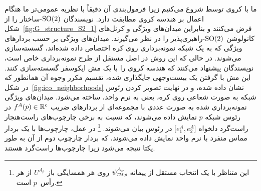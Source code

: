 ما با  کروی توسط \citet{kicanaoglu2019gaugeSphere} شروع می‌کنیم زیرا فرمول‌بندی آن دقیقاً با نظریه عمومی‌تر ما هنگام اعمال بر هندسه کروی مطابقت دارد.
نویسندگان $\operatorname{SO}(2)$-ساختار را از شکل~\ref{fig:G_structure_S2_1} فرض می‌کنند و بنابراین میدان‌های ویژگی و کرنل‌های کانولوشن $\operatorname{SO}(2)$-راهبری‌پذیر را در نظر می‌گیرند.
میدان‌های ویژگی بر حسب بردارهای ویژگی که به یک شبکه نمونه‌برداری روی کره اختصاص داده شده‌اند، گسسته‌سازی می‌شوند.
در حالی که این روش در اصل مستقل از طرح نمونه‌برداری خاص است، نویسندگان پیشنهاد می‌کنند که هندسه کروی را با یک مش ایکوسفر گسسته‌سازی کنند.
این مش با گرفتن یک بیست‌وجهی جایگذاری شده، تقسیم مکرر وجوه آن همانطور که در شکل~\ref{fig:ico_neighborhoods} نشان داده شده، و در نهایت تصویر کردن رئوس شبکه به صورت شعاعی روی کره، یعنی به نرم واحد، ساخته می‌شود.
میدان‌های ویژگی نمونه‌برداری شده به صورت عددی با مجموعه‌ای از بردارهای ضریب $f^A(p) \in \mathbb{R}^c$ در رئوس شبکه $p$ نمایش داده می‌شوند، که نسبت به برخی چارچوب‌های راست‌هنجار راست‌گرد دلخواه $\big[e_1^A, e_2^A \big]$ در رئوس بیان می‌شوند.%
\footnote{
	این متناظر با یک انتخاب مستقل از پیمانه $\psiTMp^{A_p}$ روی هر همسایگی باز $U^{A_p}$ از هر رأس~$p$ است.
}
در عمل، چارچوب‌ها با یک بردار مماس منفرد با نرم واحد نمایش داده می‌شوند، که بردار چارچوب دوم از آن به طور یکتا نتیجه می‌شود زیرا چارچوب‌ها راست‌گرد هستند.


